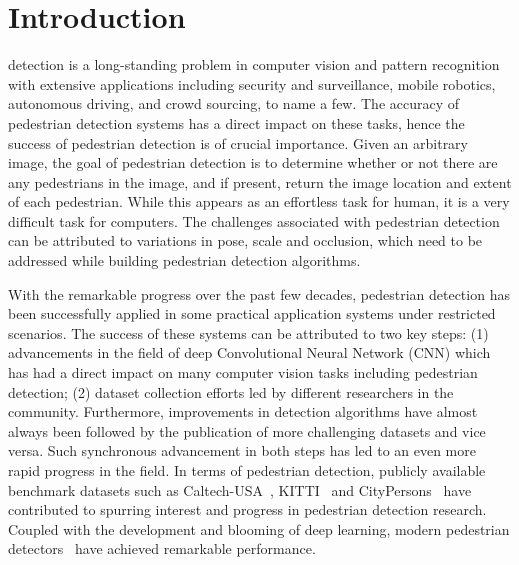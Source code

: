 \documentclass[journal]{IEEEtran}
\begin{document}
\section{Introduction}
 detection is a long-standing problem in computer vision and pattern recognition with extensive applications including security and surveillance, mobile robotics, autonomous driving, and crowd sourcing, to name a few. The accuracy of pedestrian detection systems has a direct impact on these tasks, hence the success of pedestrian detection is of crucial importance. Given an arbitrary image, the goal of pedestrian detection is to determine whether or not there are any pedestrians in the image, and if present, return the image location and extent of each pedestrian. While this appears as an effortless task for human, it is a very difficult task for computers. The challenges associated with pedestrian detection can be attributed to variations in pose, scale and occlusion, which need to be addressed while building pedestrian detection algorithms.

With the remarkable progress over the past few decades, pedestrian detection has been successfully applied in some practical application systems under restricted scenarios. The success of these systems can be attributed to two key steps: (1) advancements in the field of deep Convolutional Neural Network (CNN) which has had a direct impact on many computer vision tasks including pedestrian detection; (2) dataset collection efforts led by different researchers in the community. Furthermore, improvements in detection algorithms have almost always been followed by the publication of more challenging datasets and vice versa. Such synchronous advancement in both steps has led to an even more rapid progress in the field. In terms of pedestrian detection, publicly available benchmark datasets such as Caltech-USA~\cite{DBLP:journals/pami/DollarWSP12}, KITTI~\cite{DBLP:conf/cvpr/GeigerLU12} and CityPersons~\cite{DBLP:conf/cvpr/ZhangBS17} have contributed to spurring interest and progress in pedestrian detection research. Coupled with the development and blooming of deep learning, modern pedestrian detectors~\cite{DBLP:conf/cvpr/ZhangYS18, DBLP:journals/corr/abs-1711-07752, wang2018pedestrian, DBLP:journals/tmm/LiLSXFY18, zhang2018occlusion} have achieved remarkable performance.
\end{document}
